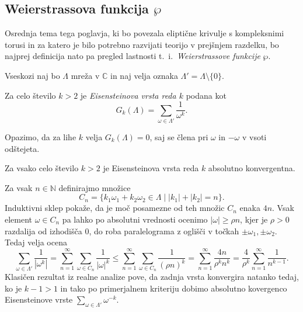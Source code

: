 \documentclass[mat1]{fmfdelo}
\numberwithin{equation}{section}
\newcommand{\N}{\mathbb N}
\newcommand{\C}{\mathbb C}
\newcommand{\om}{\omega}
\newcommand{\abs}[1]{\left\lvert #1 \right\rvert}
\newcommand{\ti}{t.~i.\ }
\theoremstyle{definition}
\begin{document}

\subsection{Weierstrassova funkcija $\wp$}

Osrednja tema tega poglavja, ki bo povezala eliptične krivulje s kompleksnimi torusi in za katero je bilo potrebno razvijati teorijo v prejšnjem razdelku, bo najprej definicija nato pa pregled lastnosti \ti \emph{Weierstrassove funkcije} $\wp$. 

Vseskozi naj bo $\Lambda$ mreža v $\C$ in naj velja oznaka $\Lambda' = \Lambda \setminus \{0\}$.

\begin{definicija}
    \label{eisensteinova vrsta}
    Za celo število $k > 2$ je \emph{Eisensteinova vrsta reda $k$} podana kot
    \[
        G_k(\Lambda) = \sum_{\om \in \Lambda'} \frac{1}{\om^k}.  
    \]
\end{definicija}

\begin{opomba}
    Opazimo, da za lihe $k$ velja $G_k(\Lambda) = 0$, saj se člena pri $\om$ in $-\om$ v vsoti odštejeta. 
\end{opomba}

\begin{lema}
    \label{lema o konvergenci eisensteinove vrste}
    Za vsako celo število $k > 2$ je Eisensteinova vrsta reda $k$ absolutno konvergentna.
\end{lema}

\begin{dokaz}
    Za vsak $n \in \N$ definirajmo množice
    \[
        C_n = \{k_1 \om_1 + k_2 \om_2\in \Lambda \mid \abs{k_1} + \abs{k_2} = n\}.  
    \]
    Induktivni sklep pokaže, da je moč posamezne od teh množic $C_n$ enaka $4n$.
    Vsak element $\om \in C_n$ pa lahko po absolutni vrednosti ocenimo $\left\lvert \om \right\rvert \geq \rho n$, kjer je $\rho > 0$ razdalija od izhodišča $0$, do roba paralelograma z oglišči v točkah $\pm \om_1, \pm \om_2$. Tedaj velja ocena
    \[
        \sum_{\om \in \Lambda'} \frac{1}{\left\lvert  \om^k \right\rvert} = 
        \sum_{n = 1}^\infty \sum_{\om \in C_n} \frac{1}{\left\lvert  \om \right\rvert^k} \leq
        \sum_{n = 1}^\infty \sum_{\om \in C_n} \frac{1}{(\rho n)^k} =
        \sum_{n = 1}^\infty \frac{4n}{\rho^k n^k} = 
        \frac{4}{\rho^k} \sum_{n = 1}^\infty \frac{1}{n^{k-1}}.
    \]
    Klasičen rezultat iz realne analize pove, da zadnja vrsta konvergira natanko tedaj, ko je $k - 1 > 1$ in tako po primerjalnem kriteriju dobimo absolutno kovergenco Eisensteinove vrste $\sum_{\om \in \Lambda'} \om^{-k}$.
\end{dokaz}
\end{document}

